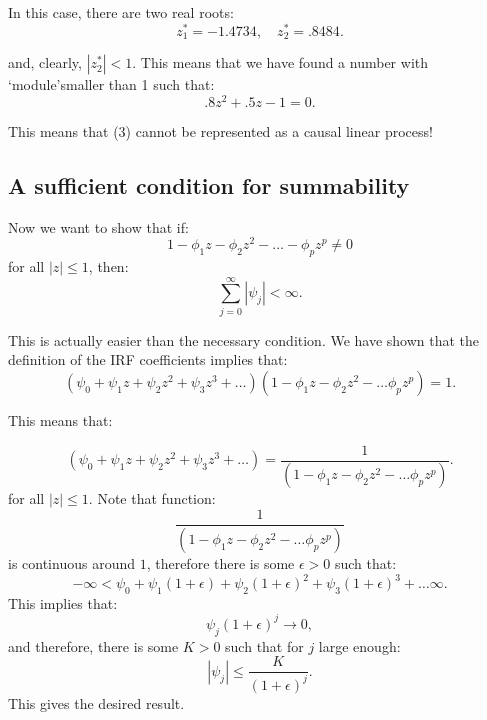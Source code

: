 \documentclass[12] {article}
\begin{document}
\noindent In this case, there are two real roots:
\[z^*_1 = -1.4734, \quad z^*_2 = .8484. \]

\noindent and, clearly, $|z^*_2| < 1$. This means that we have found a number with `module\textquoteright smaller than 1 such that:
\[.8 z^2 + .5 z -1 = 0.\]

\noindent This means that (3) cannot be represented as a causal linear process!

\subsection{A sufficient condition for summability}

Now we want to show that if:
\[ 1-\phi_1 z -\phi_2 z^2 - \ldots - \phi_p z^p \neq 0 \] 
for all $|z| \leq 1$, then:
\begin{equation}
\sum_{j=0}^{\infty} |\psi_j| < \infty. 
\end{equation} 

\noindent This is actually easier than the necessary condition. We have shown that the definition of the IRF coefficients implies that:
\[ (\psi_0 + \psi_1 z + \psi_2 z^2 + \psi_3 z^3 + \ldots  ) (1 - \phi_1 z - \phi_2 z^2  - \ldots \phi_p z^p ) = 1. \]

\noindent This means that:

\[ (\psi_0 + \psi_1 z + \psi_2 z^2 + \psi_3 z^3 + \ldots  ) = \frac{1}{ (1 - \phi_1 z - \phi_2 z^2  - \ldots \phi_p z^p )}. \]
for all $|z| \leq 1$. Note that function:
\[\frac{1}{ (1 - \phi_1 z - \phi_2 z^2  - \ldots \phi_p z^p )}\] 
is continuous around $1$, therefore there is some $\epsilon>0$ such that:
\[ -\infty <\psi_0 + \psi_1 (1+\epsilon) + \psi_2 (1+\epsilon)^2 + \psi_3 (1+\epsilon)^3 + \ldots \infty.\]
This implies that:
\[\psi_j (1+\epsilon)^j \rightarrow 0,\]
and therefore, there is some $K>0$ such that for $j$ large enough:
\[ |\psi_j| \leq \frac{K}{(1+\epsilon)^j}.\]
This gives the desired result. 
\newpage



 
 
\end{document}
